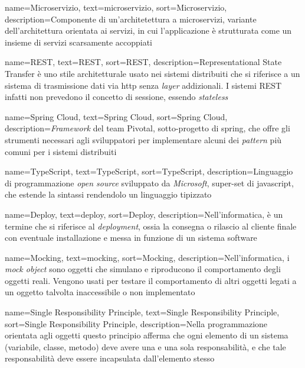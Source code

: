 {
    name=Microservizio,
    text=microservizio,
    sort=Microservizio,
    description={Componente di un'architetettura a microservizi, variante dell'architettura orientata ai servizi, in cui l'applicazione è strutturata come un insieme di servizi scarsamente accoppiati}
}

{
    name=REST,
    text=REST,
    sort=REST,
    description={Representational State Transfer è uno stile architetturale usato nei sistemi distribuiti che si riferisce a un sistema di trasmissione dati via \acrshort{http} senza \emph{layer} addizionali. I sistemi REST infatti non prevedono il concetto di sessione, essendo \textit{stateless}}
}

{
    name=Spring Cloud,
    text=Spring Cloud,
    sort=Spring Cloud,
    description={\textit{Framework} del team Pivotal, sotto-progetto di \gls{spring}, che offre gli strumenti necessari agli sviluppatori per implementare alcuni dei \textit{pattern} più comuni per i sistemi distribuiti}
}

{
    name=TypeScript,
    text=TypeScript,
    sort=TypeScript,
    description={Linguaggio di programmazione \emph{open source} sviluppato da \emph{Microsoft}, super-set di \gls{javascript}, che estende la sintassi rendendolo un linguaggio tipizzato}
}

{
    name=Deploy,
    text=deploy,
    sort=Deploy,
    description={Nell'informatica, è un termine che si riferisce al \emph{deployment}, ossia la consegna o rilascio al cliente finale con eventuale installazione e messa in funzione di un sistema software}
}


{
    name=Mocking,
    text=mocking,
    sort=Mocking,
    description={Nell'informatica, i \emph{mock object} sono oggetti che simulano e riproducono il comportamento degli oggetti reali. Vengono usati per testare il comportamento di altri oggetti legati a un oggetto talvolta inaccessibile o non implementato}
}

{
    name=Single Responsibility Principle,
    text=Single Responsibility Principle,
    sort=Single Responsibility Principle,
    description={Nella programmazione orientata agli oggetti questo principio afferma che ogni elemento di un sistema (variabile, classe, metodo) deve avere una e una sola responsabilità, e che tale responsabilità deve essere incapsulata dall'elemento stesso}
}

